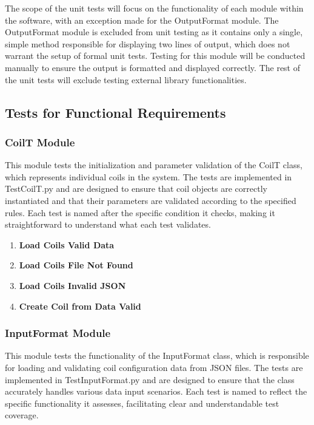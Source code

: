 \documentclass[12pt, titlepage]{article}
\newcommand{\UTthettnum}{UT\theuttnum}
\begin{document}
The scope of the unit tests will focus on the functionality of each module within the software, with an exception made for the OutputFormat module. The OutputFormat module is excluded from unit testing as it contains only a single, simple method responsible for displaying two lines of output, which does not warrant the setup of formal unit tests. Testing for this module will be conducted manually to ensure the output is formatted and displayed correctly. The rest of the unit tests will exclude testing external library functionalities.
\subsection{Tests for Functional Requirements}

\subsubsection{CoilT Module}

This module tests the initialization and parameter validation of the CoilT class, which represents individual coils in the system. The tests are implemented in TestCoilT.py and are designed to ensure that coil objects are correctly instantiated and that their parameters are validated according to the specified rules. Each test is named after the specific condition it checks, making it straightforward to understand what each test validates.

\begin{enumerate}
  \item[\refstepcounter{uttnum} \UTthettnum:] \textbf{Load Coils Valid Data}
  \item[\refstepcounter{uttnum} \UTthettnum:] \textbf{Load Coils File Not Found}
  \item[\refstepcounter{uttnum} \UTthettnum:] \textbf{Load Coils Invalid JSON}
  \item[\refstepcounter{uttnum} \UTthettnum:] \textbf{Create Coil from Data Valid}
  
\end{enumerate}

\subsubsection{InputFormat Module}

This module tests the functionality of the InputFormat class, which is responsible for loading and validating coil configuration data from JSON files. The tests are implemented in TestInputFormat.py and are designed to ensure that the class accurately handles various data input scenarios. Each test is named to reflect the specific functionality it assesses, facilitating clear and understandable test coverage.
\end{document}
